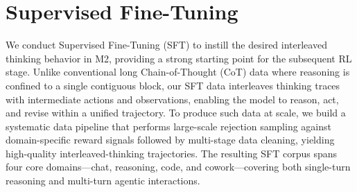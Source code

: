 \section{Supervised Fine-Tuning}

We conduct Supervised Fine-Tuning (SFT) to instill the desired interleaved thinking behavior in M2, providing a strong starting point for the subsequent RL stage. Unlike conventional long Chain-of-Thought (CoT) data where reasoning is confined to a single contiguous block, our SFT data interleaves thinking traces with intermediate actions and observations, enabling the model to reason, act, and revise within a unified trajectory. To produce such data at scale, we build a systematic data pipeline that performs large-scale rejection sampling against domain-specific reward signals followed by multi-stage data cleaning, yielding high-quality interleaved-thinking trajectories. The resulting SFT corpus spans four core domains---chat, reasoning, code, and cowork---covering both single-turn reasoning and multi-turn agentic interactions.
